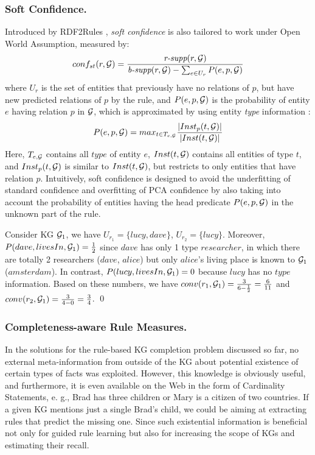 \subsubsection{Soft Confidence.} Introduced by RDF2Rules \cite{rdf2rules}, \textit{soft confidence} is also tailored to work under Open World Assumption, measured by:
\[conf_{st}(r, \mathcal{G}) = \frac{\textit{r-supp}(r, \mathcal{G})}{\textit{b-supp}(r,\mathcal{G}) - \sum_{e \in U_r}P(e,p,\mathcal{G})} \]
where $U_r$ is the set of entities that previously have no relations of $p$, but have new predicted relations of $p$ by the rule, and $P(e,p,\mathcal{G})$ is the probability of entity $e$ having relation $p$ in $\mathcal{G}$, which is approximated by using entity \textit{type} information \cite{rdf2rules}:
\[P(e,p,\mathcal{G})  = max_{t \in T_{e,\mathcal{G}}}\frac{|Inst_p(t, \mathcal{G})|}{|Inst(t, \mathcal{G})|}{}\]
Here, $T_{e,\mathcal{G}}$ contains all $type$ of entity $e$, $Inst(t, \mathcal{G})$ contains all entities of type $t$, and $Inst_p(t, \mathcal{G})$ is similar to $Inst(t, \mathcal{G})$, but restricts to only entities that have relation $p$.
Intuitively, soft confidence is designed to avoid the underfitting of standard confidence and overfitting of PCA confidence by also taking into account the probability of entities having the head predicate $P(e,p, \mathcal{G})$ in the unknown part of the rule.
\begin{example}
Consider KG $\mathcal{G}_1$, we have $U_{r_1} = \{lucy, dave\}$, $U_{r_2} = \{lucy\}$. Moreover, $P(dave,livesIn,\mathcal{G}_1) = \frac{1}{2}$ since $dave$ has only 1 type $researcher$, in which there are totally 2 researchers ($dave$, $alice$) but only $alice$'s living place is known to $\mathcal{G}_1$ ($amsterdam$). In contrast, $P(lucy,livesIn,\mathcal{G}_1) = 0$ because $lucy$ has no $type$ information.
Based on these numbers, we have $conv(r_1,\mathcal{G}_1) = \frac{3}{6-\frac{1}{2}} = \frac{6}{11}$ and $conv(r_2,\mathcal{G}_1) = \frac{3}{4-0} = \frac{3}{4}$.
\qed
\end{example}
\subsubsection{Completeness-aware Rule Measures.}  
In the solutions for the rule-based KG completion problem discussed so far, no external meta-information from outside of the KG about potential existence of certain types of facts was exploited. However, this knowledge is obviously useful, and furthermore, it is even available on the Web
in the form of Cardinality Statements, e. g., Brad has three children or Mary is a citizen of two countries. If a given KG mentions just a single Brad’s child, we could be aiming at extracting rules that predict the missing
one. Since such existential information is beneficial not only for guided rule learning but also for increasing the scope of KGs and estimating their recall.


